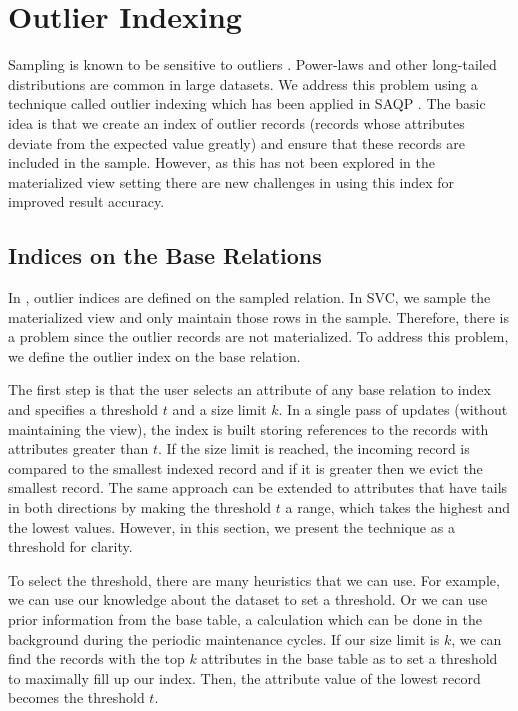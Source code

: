 \section{Outlier Indexing}\label{outlier}
Sampling is known to be sensitive to outliers \cite{clauset2009power, chaudhuri2001overcoming}.
Power-laws and other long-tailed distributions are common in large datasets\cite{clauset2009power}.
We address this problem using a technique called outlier indexing which has been applied in SAQP \cite{chaudhuri2001overcoming}.
The basic idea is that we create an index of outlier records (records whose attributes deviate from the expected value greatly) and ensure that these records are included in the sample.
However, as this has not been explored in the materialized view setting there are new challenges in using this index for improved result accuracy.

\subsection{Indices on the Base Relations}
In \cite{chaudhuri2001overcoming}, outlier indices are defined on the sampled relation. 
In SVC, we sample the materialized view and only maintain those rows in the sample.
Therefore, there is a problem since the outlier records are not materialized.
To address this problem, we define the outlier index on the base relation.

The first step is that the user selects an attribute of any base relation to index and specifies a threshold $t$ and a size limit $k$.
In a single pass of updates (without maintaining the view), the index is built storing references to the records with attributes greater than $t$.
If the size limit is reached, the incoming record is compared to the smallest indexed record and if it is greater then we evict the smallest record.
The same approach can be extended to attributes that have tails in both directions by making the threshold $t$ a range, which takes the highest and the lowest values.
However, in this section, we present the technique as a threshold for clarity.

To select the threshold, there are many heuristics that we can use.
For example, we can use our knowledge about the dataset to set a threshold.
Or we can use prior information from the base table, a calculation which can be done in the background during the periodic maintenance cycles.
If our size limit is $k$, we can find the records with the top $k$ attributes in the base table as to set a threshold to maximally fill up our index. 
Then, the attribute value of the lowest record becomes the threshold $t$.

